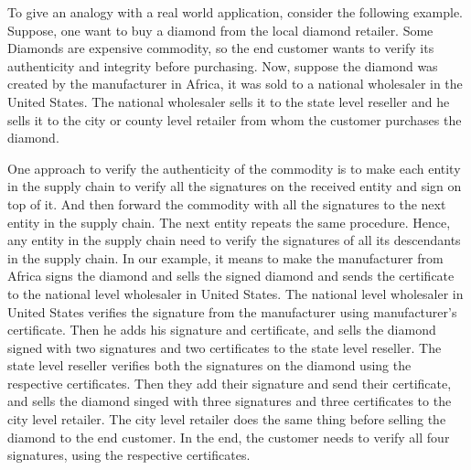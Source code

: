 	To give an analogy with a real world application, consider the following example.
	Suppose, one want to buy a diamond from the local diamond retailer.
	Some Diamonds are expensive commodity, so the end customer wants to verify its authenticity and integrity before purchasing.
	Now, suppose the diamond was created by the manufacturer in Africa, it was sold to a national wholesaler in the United States. 
	The national wholesaler sells it to the state level reseller and he sells it to the city or county level retailer from whom the customer purchases the diamond.

	One approach to verify the authenticity of the commodity is to make each entity in the supply chain to verify all the signatures on the received entity and sign on top of it.
	And then forward the commodity with all the signatures to the next entity in the supply chain.
	The next entity repeats the same procedure.
	Hence, any entity in the supply chain need to verify the signatures of all its descendants in the supply chain.
	In our example, it means to make the manufacturer from Africa signs the diamond and sells the signed diamond and sends the certificate to the national level wholesaler in United States.
	The national level wholesaler in United States verifies the signature from the manufacturer using manufacturer's certificate.
	Then he adds his signature and certificate, and sells the diamond signed with two signatures and two certificates to the state level reseller.
	The state level reseller verifies both the signatures on the diamond using the respective certificates.
	Then they add their signature and send their certificate, and sells the diamond singed with three signatures and three certificates to the city level retailer. 
	The city level retailer does the same thing before selling the diamond to the end customer.
	In the end, the customer needs to verify all four signatures, using the respective certificates.


